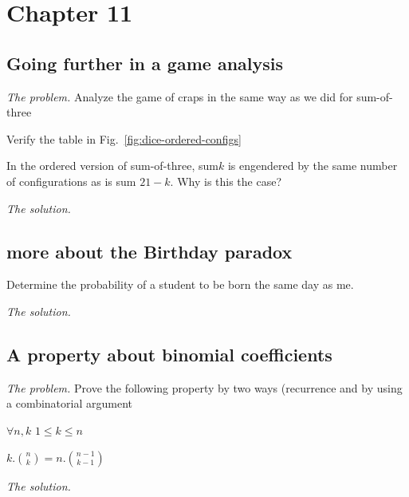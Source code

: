 
\section{Chapter 11}

\subsection{Going further in a game analysis}

\noindent \textit{The problem.}
Analyze the game of craps in the same way as we did for sum-of-three

Verify the table in Fig.~\ref{fig:dice-ordered-configs}

In the ordered version of sum-of-three, sum$k$ is engendered by the
same number of configurations as is sum $21 - k$.  
Why is this the case?

\noindent \textit{The solution.}


\subsection{more about the Birthday paradox}

%
Determine the
probability of a student to be born the same day as me.
\medskip

\noindent \textit{The solution.}



\subsection{A property about binomial coefficients}
%

\noindent \textit{The problem.}
Prove the following property by two ways (recurrence and by using a combinatorial argument

$\forall n,k$ $1 \leq k \leq n$

$k.{n \choose k} = n.{{n-1} \choose {k-1}}$
\medskip

\noindent \textit{The solution.}






